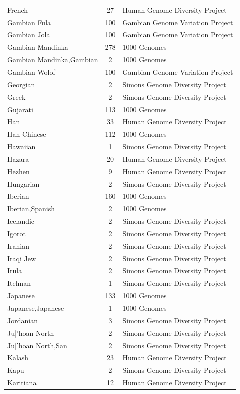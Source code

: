 \begin{longtable}[t]{lcl}
French & 27 & Human Genome Diversity Project\\
Gambian Fula & 100 & Gambian Genome Variation Project\\
Gambian Jola & 100 & Gambian Genome Variation Project\\
Gambian Mandinka & 278 & 1000 Genomes\\
Gambian Mandinka,Gambian & 2 & 1000 Genomes\\
Gambian Wolof & 100 & Gambian Genome Variation Project\\
Georgian & 2 & Simons Genome Diversity Project\\
Greek & 2 & Simons Genome Diversity Project\\
Gujarati & 113 & 1000 Genomes\\
Han & 33 & Human Genome Diversity Project\\
Han Chinese & 112 & 1000 Genomes\\
Hawaiian & 1 & Simons Genome Diversity Project\\
Hazara & 20 & Human Genome Diversity Project\\
Hezhen & 9 & Human Genome Diversity Project\\
Hungarian & 2 & Simons Genome Diversity Project\\
Iberian & 160 & 1000 Genomes\\
Iberian,Spanish & 2 & 1000 Genomes\\
Icelandic & 2 & Simons Genome Diversity Project\\
Igorot & 2 & Simons Genome Diversity Project\\
Iranian & 2 & Simons Genome Diversity Project\\
Iraqi Jew & 2 & Simons Genome Diversity Project\\
Irula & 2 & Simons Genome Diversity Project\\
Itelman & 1 & Simons Genome Diversity Project\\
Japanese & 133 & 1000 Genomes\\
Japanese,Japanese & 1 & 1000 Genomes\\
Jordanian & 3 & Simons Genome Diversity Project\\
Ju|'hoan North & 2 & Simons Genome Diversity Project\\
Ju|'hoan North,San & 2 & Simons Genome Diversity Project\\
Kalash & 23 & Human Genome Diversity Project\\
Kapu & 2 & Simons Genome Diversity Project\\
Karitiana & 12 & Human Genome Diversity Project\\

\end{longtable}
